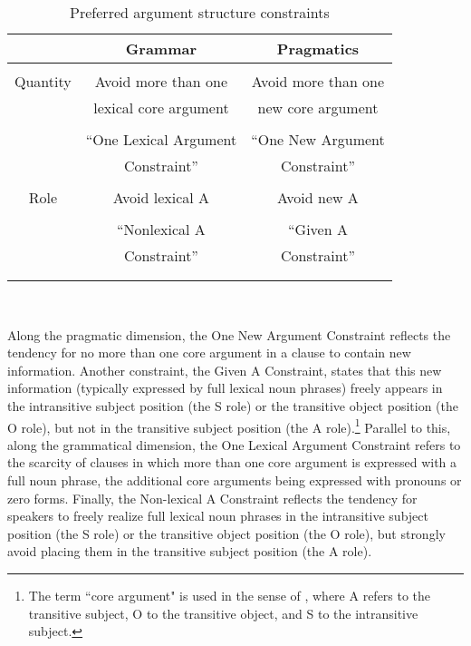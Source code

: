 \begin{table}
\begin{center}
\caption{{Preferred argument structure constraints \citep[34]{dubois2003a}}}
\begin{tabular}{ c  c  c }
\lsptoprule
 & Grammar & Pragmatics  \\

\midrule

\midrule
 & & \\
Quantity & Avoid more than one  & Avoid more than one  \\
 & lexical core argument  &  new core argument   \\
  & & \\
   & ``One Lexical Argument & ``One New Argument \\
 &  Constraint'' &  Constraint'' \\
    
\midrule
 & & \\
 Role & Avoid lexical A & Avoid new A  \\
  & & \\
 & ``Nonlexical A & ``Given A \\
 & Constraint'' & Constraint'' \\
 & & \\
 
\lspbottomrule
\end{tabular}\\
\label{constraints}
\end{center}
\end{table}

Along the pragmatic dimension, the One New Argument Constraint reflects the tendency for no more than one core argument in a clause to contain new information. Another constraint, the Given A Constraint, states that this new information (typically expressed by full lexical noun phrases) freely appears in the intransitive subject position (the S role) or the transitive object position (the O role), but not in the transitive subject position (the A role).\footnote{The term ``core argument" is used in the sense of \citet{dixon1979}, where A refers to the transitive subject, O to the transitive object, and S to the intransitive subject.} Parallel to this, along the grammatical dimension, the One Lexical Argument Constraint refers to the scarcity of clauses in which more than one core argument is expressed with a full noun phrase, the additional core arguments being expressed with pronouns or zero forms. Finally, the Non-lexical A Constraint reflects the tendency for speakers to freely realize full lexical noun phrases in the intransitive subject position (the S role) or the transitive object position (the O role), but strongly avoid placing them in the transitive subject position (the A role). 

